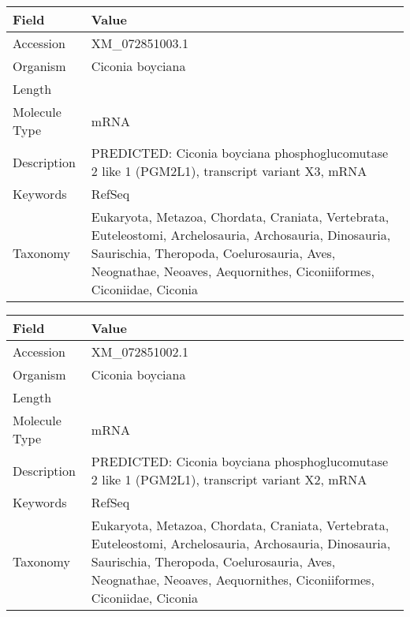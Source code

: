 \documentclass[10pt]{article}
\begin{document}
\vspace{1em}
{\footnotesize
\begin{longtable}{>{\raggedright\arraybackslash}p{4.5cm} >{\raggedright\arraybackslash}p{11.5cm}}
\textbf{Field} & \textbf{Value} \\
\hline
Accession & XM\_072851003.1 \\
Organism & Ciconia boyciana \\
Length & 6243 \\
Molecule Type & mRNA \\
Description & PREDICTED: Ciconia boyciana phosphoglucomutase 2 like 1 (PGM2L1), transcript variant X3, mRNA \\
Keywords & RefSeq \\
Taxonomy & Eukaryota, Metazoa, Chordata, Craniata, Vertebrata, Euteleostomi, Archelosauria, Archosauria, Dinosauria, Saurischia, Theropoda, Coelurosauria, Aves, Neognathae, Neoaves, Aequornithes, Ciconiiformes, Ciconiidae, Ciconia \\
\end{longtable}
}

\vspace{1em}
{\footnotesize
\begin{longtable}{>{\raggedright\arraybackslash}p{4.5cm} >{\raggedright\arraybackslash}p{11.5cm}}
\textbf{Field} & \textbf{Value} \\
\hline
Accession & XM\_072851002.1 \\
Organism & Ciconia boyciana \\
Length & 6166 \\
Molecule Type & mRNA \\
Description & PREDICTED: Ciconia boyciana phosphoglucomutase 2 like 1 (PGM2L1), transcript variant X2, mRNA \\
Keywords & RefSeq \\
Taxonomy & Eukaryota, Metazoa, Chordata, Craniata, Vertebrata, Euteleostomi, Archelosauria, Archosauria, Dinosauria, Saurischia, Theropoda, Coelurosauria, Aves, Neognathae, Neoaves, Aequornithes, Ciconiiformes, Ciconiidae, Ciconia \\
\end{longtable}
}
\end{document}
